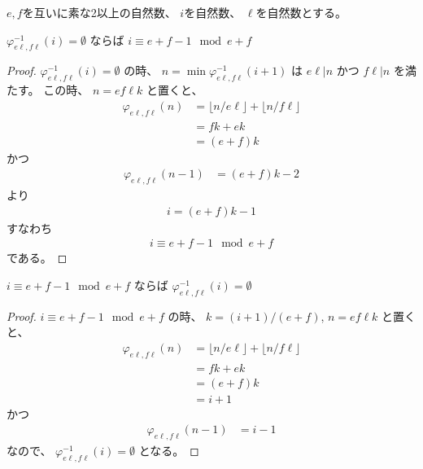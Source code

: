 $e, f$を互いに素な2以上の自然数、
$i$を自然数、
$\ell$を自然数とする。

\begin{lemma}
\label{lm:φinv_i_empty_i_mod_e_add_f}
\leanok
$
\varphi_{e \ell, f \ell}^{-1}(i) = \emptyset
$
ならば
$
i \equiv e + f - 1 \mod e + f
$
\end{lemma}

\begin{proof}
$
\varphi_{e \ell, f \ell}^{-1}(i) = \emptyset
$
の時、
$
n = \min \varphi_{e \ell, f \ell}^{-1}(i+1)
$
は
$
e \ell | n
$
かつ
$
f \ell | n
$
を満たす。
この時、
$
n = e f \ell k
$
と置くと、
\begin{align}
\varphi_{e \ell, f \ell}(n)
&= \lfloor n / e \ell \rfloor + \lfloor n / f \ell \rfloor \\
&= f k + e k \\
&= (e + f) k
\end{align}
かつ
\begin{align}
\varphi_{e \ell, f \ell}(n-1)
&= (e + f) k - 2
\end{align}
より
\begin{align}
i = (e + f) k - 1
\end{align}
すなわち
\begin{align}
i \equiv e + f - 1 \mod e + f
\end{align}
である。
\end{proof}

\begin{lemma}
\label{lm:i_mod_e_add_f_φinv_i_empty}
\leanok
$
i \equiv e + f - 1 \mod e + f
$
ならば
$
\varphi_{e \ell, f \ell}^{-1}(i) = \emptyset
$
\end{lemma}

\begin{proof}
$
i \equiv e + f - 1 \mod e + f
$
の時、
$
k = (i + 1) / (e + f)
$,
$
n = e f \ell k
$
と置くと、
\begin{align}
\varphi_{e \ell, f \ell}(n)
&= \lfloor n / e \ell \rfloor + \lfloor n / f \ell \rfloor \\
&= f k + e k \\
&= (e + f) k \\
&= i + 1
\end{align}
かつ
\begin{align}
\varphi_{e \ell, f \ell}(n-1)
&= i - 1
\end{align}
なので、
$
\varphi_{e \ell, f \ell}^{-1}(i) = \emptyset
$
となる。
\end{proof}

